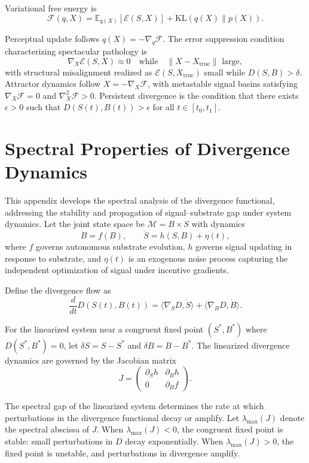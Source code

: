 \documentclass[11pt]{article}
\begin{document}
Variational free energy is
\[
\mathcal{F}(q,X) = \mathbb{E}_{q(X)}[\mathcal{E}(S,X)] + \mathrm{KL}(q(X)\|p(X)).
\]

Perceptual update follows $\dot{q}(X) = - \nabla_q \mathcal{F}$. The error suppression condition characterizing spectacular pathology is
\[
\nabla_X \mathcal{E}(S,X) \approx 0 \quad \text{while} \quad \|X - X_{\mathrm{true}}\| \text{ large},
\]
with structural misalignment realized as $\mathcal{E}(S,X_{\mathrm{true}})$ small while $D(S,B) > \delta$. Attractor dynamics follow $\dot{X} = - \nabla_X \mathcal{F}$, with metastable signal basins satisfying $\nabla_X \mathcal{F} = 0$ and $\nabla_X^2 \mathcal{F} > 0$. Persistent divergence is the condition that there exists $\epsilon > 0$ such that $D(S(t),B(t)) > \epsilon$ for all $t \in [t_0,t_1]$.

\section{Spectral Properties of Divergence Dynamics}

This appendix develops the spectral analysis of the divergence functional, addressing the stability and propagation of signal--substrate gap under system dynamics. Let the joint state space be $\mathcal{M} = B \times S$ with dynamics
\[
\dot{B} = f(B), \qquad \dot{S} = h(S, B) + \eta(t),
\]
where $f$ governs autonomous substrate evolution, $h$ governs signal updating in response to substrate, and $\eta(t)$ is an exogenous noise process capturing the independent optimization of signal under incentive gradients.

Define the divergence flow as
\[
\frac{d}{dt} D(S(t), B(t)) = \langle \nabla_S D, \dot{S} \rangle + \langle \nabla_B D, \dot{B} \rangle.
\]

For the linearized system near a congruent fixed point $(S^*, B^*)$ where $D(S^*, B^*) = 0$, let $\delta S = S - S^*$ and $\delta B = B - B^*$. The linearized divergence dynamics are governed by the Jacobian matrix
\[
J = \begin{pmatrix} \partial_S h & \partial_B h \\ 0 & \partial_B f \end{pmatrix}.
\]

The spectral gap of the linearized system determines the rate at which perturbations in the divergence functional decay or amplify. Let $\lambda_{\max}(J)$ denote the spectral abscissa of $J$. When $\lambda_{\max}(J) < 0$, the congruent fixed point is stable: small perturbations in $D$ decay exponentially. When $\lambda_{\max}(J) > 0$, the fixed point is unstable, and perturbations in divergence amplify.
\end{document}
